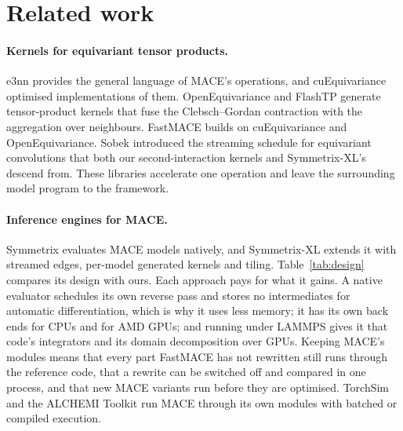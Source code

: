 \documentclass[11pt]{article}
\begin{document}
\section{Related work}
\label{sec:related}

\paragraph{Kernels for equivariant tensor products.}
e3nn \cite{geiger2022e3nn} provides the general language of MACE's operations, and cuEquivariance
\cite{cuequivariance} optimised implementations of them. OpenEquivariance \cite{bharadwaj2025oeq} and FlashTP
\cite{lee2025flashtp} generate tensor-product kernels that fuse the Clebsch--Gordan contraction with the
aggregation over neighbours. FastMACE builds on cuEquivariance and OpenEquivariance. Sobek
\cite{chorosajev2026sobek} introduced the streaming schedule for equivariant convolutions that both our
second-interaction kernels and Symmetrix-XL's descend from. These libraries accelerate one operation and leave
the surrounding model program to the framework.

\paragraph{Inference engines for MACE.}
Symmetrix \cite{witt2026symmetrix} evaluates MACE models natively, and Symmetrix-XL \cite{fu2026symmetrixxl}
extends it with streamed edges, per-model generated kernels and tiling. Table~\ref{tab:design} compares its
design with ours. Each approach pays for what it gains. A native evaluator schedules its own reverse pass and
stores no intermediates for automatic differentiation, which is why it uses less memory; it has its own back
ends for CPUs and for AMD GPUs; and running under LAMMPS gives it that code's integrators and its domain
decomposition over GPUs. Keeping MACE's modules means that every part FastMACE has not rewritten still runs
through the reference code, that a rewrite can be switched off and compared in one process, and that new MACE
variants run before they are optimised. TorchSim \cite{torchsim} and the ALCHEMI Toolkit \cite{alchemi} run MACE
through its own modules with batched or compiled execution.
\end{document}
